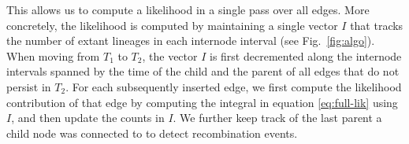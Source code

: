 \documentclass{article}
\newcommand{\argweaver}[0]{\texttt{ARGweaver}}
\begin{document}
This allows us to compute a likelihood in a single pass over all edges.
More concretely, the likelihood is computed by maintaining a single vector $I$ that tracks
the number of extant lineages in each internode interval (see Fig.~\ref{fig:algo}).
When moving from $T_1$ to $T_2$, the vector $I$ is first decremented along 
the internode intervals
spanned by the time of the child and the parent of all edges that do not persist in $T_2$.
For each subsequently inserted edge, we first compute the likelihood contribution
of that edge by computing the integral
in equation \eqref{eq:full-lik} using $I$, and then update the counts in $I$.
We further keep track of
the last parent a child node was connected to to detect recombination events.



\end{document}
